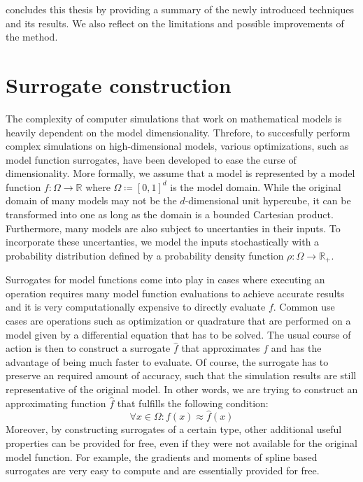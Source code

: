 \documentclass[
  a4paper,  %
  twoside,  %
  bibliography=totoc,
  headsepline,
  cleardoublepage=empty,
  parskip=half,
  draft=false
]{scrbook}
\begin{document}
 concludes this thesis by providing a summary of the newly introduced techniques and its results.
We also reflect on the limitations and possible improvements of the method.


\chapter{Surrogate construction}
\label{chap:c2}

The complexity of computer simulations that work on mathematical models is heavily dependent on the model dimensionality.
Threfore, to succesfully perform complex simulations on high-dimensional models, various optimizations, such as model function surrogates, have been developed to ease the curse of dimensionality.
More formally, we assume that a model is represented by a model function $f \colon \Omega \to \mathds{R}$ where $\Omega \coloneqq [0,1]^d$ is the model domain.
While the original domain of many models may not be the $d$-dimensional unit hypercube, it can be transformed into one as long as the domain is a bounded Cartesian product.
Furthermore, many models are also subject to uncertanties in their inputs.
To incorporate these uncertanties, we model the inputs stochastically with a probability distribution defined by a probability density function $\rho \colon \Omega \to \mathds{R_+}$.

Surrogates for model functions come into play in cases where executing an operation requires many model function evaluations to achieve accurate results and it is very computationally expensive to directly evaluate $f$.
Common use cases are operations such as optimization or quadrature that are performed on a model given by a differential equation that has to be solved.
The usual course of action is then to construct a surrogate $\hat{f}$ that approximates $f$ and has the advantage of being much faster to evaluate.
Of course, the surrogate has to preserve an required amount of accuracy, such that the simulation results are still representative of the original model.
In other words, we are trying to construct an approximating function $\hat{f}$ that fulfills the following condition:
\begin{equation}
\forall x \in \Omega \colon f(x) \approx \hat{f}(x)
\end{equation}
%
Moreover, by constructing surrogates of a certain type, other additional useful properties can be provided for free, even if they were not available for the original model function.
For example, the gradients and moments of spline based surrogates are very easy to compute and are essentially provided for free.
\end{document}
